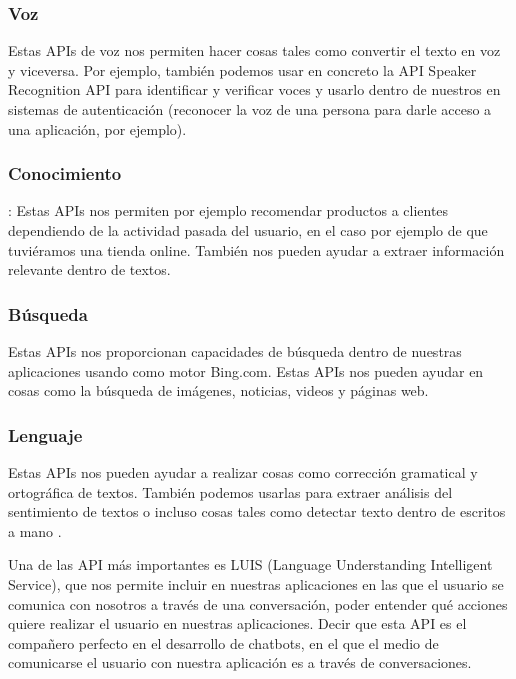 \subsubsection{Voz} Estas APIs de voz nos permiten hacer cosas tales como convertir el texto en voz y viceversa. Por ejemplo, también podemos usar en concreto la API Speaker Recognition API para identificar y verificar voces y usarlo dentro de nuestros en sistemas de autenticación (reconocer la voz de una persona para darle acceso a una aplicación, por ejemplo).

\subsubsection{Conocimiento}: Estas APIs nos permiten por ejemplo recomendar productos a clientes dependiendo de la actividad pasada del usuario, en el caso por ejemplo de que tuviéramos una tienda online. También nos pueden ayudar a extraer información relevante dentro de textos.

\subsubsection{Búsqueda} Estas APIs nos proporcionan capacidades de búsqueda dentro de nuestras aplicaciones usando como motor Bing.com. Estas APIs nos pueden ayudar en cosas como la búsqueda de imágenes, noticias, videos y páginas web.

\subsubsection{Lenguaje} Estas APIs nos pueden ayudar a realizar cosas como corrección gramatical y ortográfica de textos. También podemos usarlas para extraer análisis del sentimiento de textos o incluso cosas tales como detectar texto dentro de escritos a mano \cite{Ogiela2018}.

Una de las API más importantes es LUIS (Language Understanding Intelligent Service), que nos permite incluir en nuestras aplicaciones en las que el usuario se comunica con nosotros a través de una conversación, poder entender qué acciones quiere realizar el usuario en nuestras aplicaciones. Decir que esta API es el compañero perfecto en el desarrollo de chatbots, en el que el medio de comunicarse el usuario con nuestra aplicación es a través de conversaciones.

